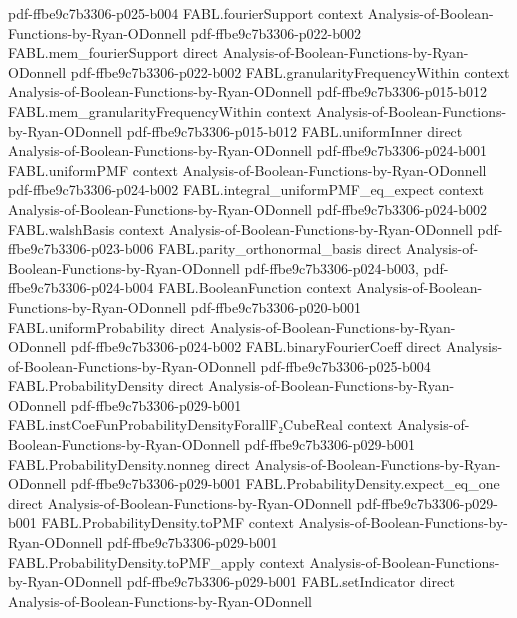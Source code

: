 \begin{theorem}
  {pdf-ffbe9c7b3306-p025-b004}
\proofstep
  {FABL.fourierSupport}
  {context}
  {Analysis-of-Boolean-Functions-by-Ryan-ODonnell}
  {pdf-ffbe9c7b3306-p022-b002}
\proofstep
  {FABL.mem_fourierSupport}
  {direct}
  {Analysis-of-Boolean-Functions-by-Ryan-ODonnell}
  {pdf-ffbe9c7b3306-p022-b002}
\proofstep
  {FABL.granularityFrequencyWithin}
  {context}
  {Analysis-of-Boolean-Functions-by-Ryan-ODonnell}
  {pdf-ffbe9c7b3306-p015-b012}
\proofstep
  {FABL.mem_granularityFrequencyWithin}
  {context}
  {Analysis-of-Boolean-Functions-by-Ryan-ODonnell}
  {pdf-ffbe9c7b3306-p015-b012}
\proofstep
  {FABL.uniformInner}
  {direct}
  {Analysis-of-Boolean-Functions-by-Ryan-ODonnell}
  {pdf-ffbe9c7b3306-p024-b001}
\proofstep
  {FABL.uniformPMF}
  {context}
  {Analysis-of-Boolean-Functions-by-Ryan-ODonnell}
  {pdf-ffbe9c7b3306-p024-b002}
\proofstep
  {FABL.integral_uniformPMF_eq_expect}
  {context}
  {Analysis-of-Boolean-Functions-by-Ryan-ODonnell}
  {pdf-ffbe9c7b3306-p024-b002}
\proofstep
  {FABL.walshBasis}
  {context}
  {Analysis-of-Boolean-Functions-by-Ryan-ODonnell}
  {pdf-ffbe9c7b3306-p023-b006}
\proofstep
  {FABL.parity_orthonormal_basis}
  {direct}
  {Analysis-of-Boolean-Functions-by-Ryan-ODonnell}
  {pdf-ffbe9c7b3306-p024-b003,
    pdf-ffbe9c7b3306-p024-b004}
\proofstep
  {FABL.BooleanFunction}
  {context}
  {Analysis-of-Boolean-Functions-by-Ryan-ODonnell}
  {pdf-ffbe9c7b3306-p020-b001}
\proofstep
  {FABL.uniformProbability}
  {direct}
  {Analysis-of-Boolean-Functions-by-Ryan-ODonnell}
  {pdf-ffbe9c7b3306-p024-b002}
\proofstep
  {FABL.binaryFourierCoeff}
  {direct}
  {Analysis-of-Boolean-Functions-by-Ryan-ODonnell}
  {pdf-ffbe9c7b3306-p025-b004}
\proofstep
  {FABL.ProbabilityDensity}
  {direct}
  {Analysis-of-Boolean-Functions-by-Ryan-ODonnell}
  {pdf-ffbe9c7b3306-p029-b001}
\proofstep
  {FABL.instCoeFunProbabilityDensityForallF₂CubeReal}
  {context}
  {Analysis-of-Boolean-Functions-by-Ryan-ODonnell}
  {pdf-ffbe9c7b3306-p029-b001}
\proofstep
  {FABL.ProbabilityDensity.nonneg}
  {direct}
  {Analysis-of-Boolean-Functions-by-Ryan-ODonnell}
  {pdf-ffbe9c7b3306-p029-b001}
\proofstep
  {FABL.ProbabilityDensity.expect_eq_one}
  {direct}
  {Analysis-of-Boolean-Functions-by-Ryan-ODonnell}
  {pdf-ffbe9c7b3306-p029-b001}
\proofstep
  {FABL.ProbabilityDensity.toPMF}
  {context}
  {Analysis-of-Boolean-Functions-by-Ryan-ODonnell}
  {pdf-ffbe9c7b3306-p029-b001}
\proofstep
  {FABL.ProbabilityDensity.toPMF_apply}
  {context}
  {Analysis-of-Boolean-Functions-by-Ryan-ODonnell}
  {pdf-ffbe9c7b3306-p029-b001}
\proofstep
  {FABL.setIndicator}
  {direct}
  {Analysis-of-Boolean-Functions-by-Ryan-ODonnell}

\end{theorem}
